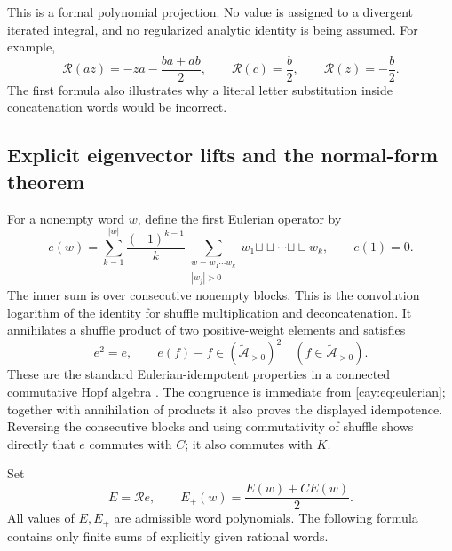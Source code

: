 This is a formal polynomial projection.  No value is assigned to a
divergent iterated integral, and no regularized analytic identity is
being assumed.  For example,
\[
 \mathcal R(az)=-za-\frac{ba+ab}{2},\qquad
 \mathcal R(c)=\frac b2,\qquad \mathcal R(z)=-\frac b2.
\]
The first formula also illustrates why a literal letter substitution
inside concatenation words would be incorrect.

\subsection{Explicit eigenvector lifts and the normal-form theorem}

For a nonempty word $w$, define the first Eulerian operator by
\begin{equation}\label{cay:eq:eulerian}
 e(w)=\sum_{k=1}^{|w|}\frac{(-1)^{k-1}}{k}
 \sum_{\substack{w=w_1\cdots w_k\\ |w_j|>0}}
  w_1\mathbin{\sqcup\!\sqcup}\cdots
  \mathbin{\sqcup\!\sqcup}w_k,\qquad e(1)=0.
\end{equation}
The inner sum is over consecutive nonempty blocks.  This is the
convolution logarithm of the identity for shuffle multiplication and
deconcatenation.  It annihilates a shuffle product of two positive-weight
elements and satisfies
\begin{equation}\label{cay:eq:eulerian-properties}
 e^2=e,\qquad e(f)-f\in
   (\widetilde{\mathcal A}_{>0})^2
 \quad(f\in\widetilde{\mathcal A}_{>0}).
\end{equation}
These are the standard Eulerian-idempotent properties in a connected
commutative Hopf algebra \cite{cay:Patras}.  The congruence is immediate
from \eqref{cay:eq:eulerian}; together with annihilation of products it
also proves the displayed idempotence.  Reversing the consecutive blocks
and using commutativity of shuffle shows directly that $e$ commutes
with $C$; it also commutes with $K$.

Set
\begin{equation}\label{cay:eq:lifts}
 E=\mathcal R e,\qquad
 E_+(w)=\frac{E(w)+C E(w)}2.
\end{equation}
All values of $E,E_+$ are admissible word polynomials.  The following
formula contains only finite sums of explicitly given rational words.

